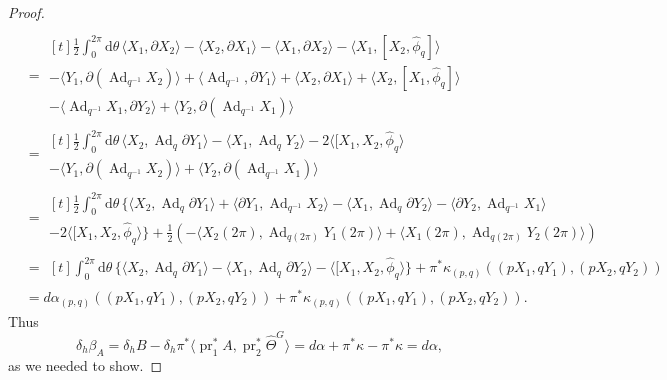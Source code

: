 \documentclass[12pt]{amsart}
\DeclareMathOperator{\Ad}{Ad}
\DeclareMathOperator{\pr}{pr}
\theoremstyle{plain}
\theoremstyle{definition}
\theoremstyle{remark}
\numberwithin{equation}{section}
\newcommand{\<}{\langle}
\renewcommand{\>}{\rangle}
\newcommand{\intSone}{\int_{0}^{2\pi}\mathrm{d}\theta\,}
\newcommand{\Thetahat}{\widehat{\Theta}}
\newcommand{\phihat}{\widehat{\phi}}
\begin{document}
\begin{proof}
\begin{align*}
\\
&=\begin{multlined}[t]
\frac12 \intSone \langle X_1,\partial X_2\rangle - \langle X_2,\partial X_1\rangle - \langle X_1,\partial X_2\rangle - \langle X_1,[X_2,\phihat_q] \rangle\\
-\langle Y_1,\partial(\Ad_{q^{-1}}X_2)\rangle 
+ \langle \Ad_{q^{-1}}, \partial Y_1\rangle
+ \langle X_2,\partial X_1\rangle + \langle X_2,[X_1,\phihat_q]\rangle\\
-\langle\Ad_{q^{-1}}X_1,\partial Y_2\rangle
+ \langle Y_2,\partial(\Ad_{q^{-1}}X_1)\rangle
\end{multlined}
\\
&=\begin{multlined}[t]
\frac12 \intSone \langle X_2,\Ad_q\partial Y_1\rangle
- \langle X_1,\Ad_q Y_2\rangle
-2\langle [X_1,X_2,\phihat_q\rangle\\
-\langle Y_1,\partial(\Ad_{q^{-1}}X_2)\rangle
+ \langle Y_2,\partial(\Ad_{q^{-1}}X_1)\rangle
\end{multlined}
\\
&=\begin{multlined}[t]
\frac12\intSone \Big\{\langle X_2,\Ad_q\partial Y_1\rangle 
+ \langle \partial Y_1, \Ad_{q^{-1}} X_2\rangle
- \langle X_1,\Ad_q\partial Y_2\rangle
- \langle \partial Y_2,\Ad_{q^{-1}}X_1 \rangle \\
- 2\langle [X_1,X_2,\phihat_q\rangle\Big\} + \tfrac12 \left(-\langle X_2(2\pi),\Ad_{q(2\pi)}Y_1(2\pi)\rangle + \langle X_1(2\pi),\Ad_{q(2\pi)}Y_2(2\pi)\rangle \right)
\end{multlined}\\
&=\begin{multlined}[t]
\intSone \Big\{\langle X_2,\Ad_q\partial Y_1\rangle
- \langle X_1,\Ad_q\partial Y_2\rangle
- \langle [X_1,X_2,\phihat_q\rangle\Big\} + \pi^*\kappa_{(p,q)}\left((pX_1,qY_1),(pX_2,qY_2)\right)
\end{multlined}\\
&= d\alpha_{(p,q)}\left((pX_1,qY_1),(pX_2,qY_2)\right) + \pi^*\kappa_{(p,q)}\left((pX_1,qY_1),(pX_2,qY_2)\right).
\end{align*}
Thus
\[
\delta_h\beta_A= \delta_h B - \delta_h\pi^*\langle\pr_1^*A, \pr_2^* \Thetahat^G\rangle = d\alpha+ \pi^*\kappa -\pi^*\kappa =d\alpha,
\]
as we needed to show.
\end{proof}
\end{document}
